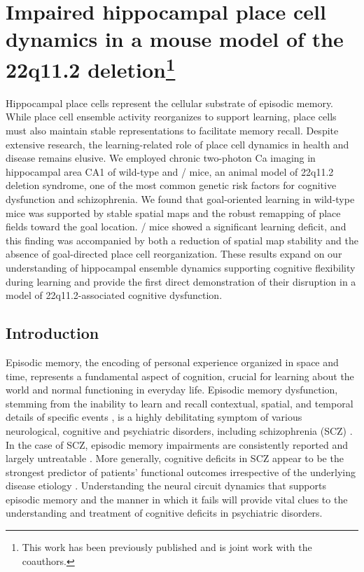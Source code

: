 \acresetall
\newcommand{\Aprime}{}
\def\Aprime/{Context~A\super{$\prime$}}
\newcommand{\A}{}
\def\A/{Context~A}


\chapter[Impaired hippocampal place cell dynamics in a mouse model of the 22q11.2 deletion]{Impaired hippocampal place cell dynamics in a mouse model of the 22q11.2 deletion\footnote{This work has been previously published \citep{Zaremba2017a, Zaremba2017b} and is joint work with the coauthors.}}
\label{ch:df}

Hippocampal place cells represent the cellular substrate of episodic memory. While place cell ensemble activity reorganizes to support learning, place cells must also maintain stable representations to facilitate memory recall. Despite extensive research, the learning-related role of place cell dynamics in health and disease remains elusive. We employed chronic two-photon Ca imaging in hippocampal area CA1 of wild-type and \df/ mice, an animal model of 22q11.2 deletion syndrome, one of the most common genetic risk factors for cognitive dysfunction and schizophrenia. We found that goal-oriented learning in wild-type mice was supported by stable spatial maps and the robust remapping of place fields toward the goal location. \df/ mice showed a significant learning deficit, and this finding was accompanied by both a reduction of spatial map stability and the absence of goal-directed place cell reorganization. These results expand on our understanding of hippocampal ensemble dynamics supporting cognitive flexibility during learning and provide the first direct demonstration of their disruption in a model of 22q11.2-associated cognitive dysfunction.

\section{Introduction}

Episodic memory, the encoding of personal experience organized in space and time, represents a fundamental aspect of cognition, crucial for learning about the world and normal functioning in everyday life. Episodic memory dysfunction, stemming from the inability to learn and recall contextual, spatial, and temporal details of specific events \citep{Dickerson2010, Eichenbaum2000}, is a highly debilitating symptom of various neurological, cognitive and psychiatric disorders, including schizophrenia (SCZ) \citep{Dere2010, Leavitt2009}. In the case of SCZ, episodic memory impairments are consistently reported \citep{Aleman1999, Schaefer2013} and largely untreatable \citep{Green1996, Ibrahim2011, Keefe2007}. More generally, cognitive deficits in SCZ appear to be the strongest predictor of patients' functional outcomes irrespective of the underlying disease etiology \citep{Green1996, Ranganath2008}. Understanding the neural circuit dynamics that supports episodic memory and the manner in which it fails will provide vital clues to the understanding and treatment of cognitive deficits in psychiatric disorders.

